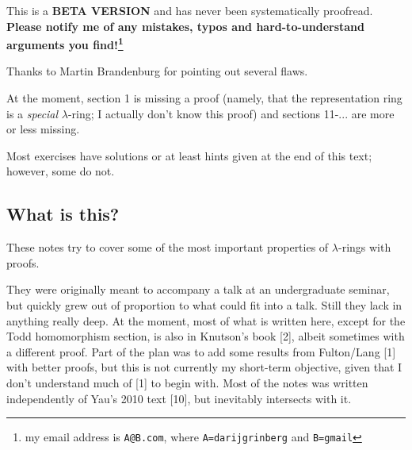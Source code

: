 \documentclass[numbers=enddot,12pt,final,onecolumn,notitlepage]{scrartcl}%
\begin{document}
\title{}
\author{Darij Grinberg}
\date{Version 0.0.17, last revised
\today
}
\maketitle
\tableofcontents



\bigskip

This is a \textbf{BETA VERSION} and has never been systematically proofread.
\textbf{Please notify me of any mistakes, typos and hard-to-understand
arguments you find!\footnote{my email address is \texttt{A@B.com}, where
\texttt{A=darijgrinberg} and \texttt{B=gmail}}}

Thanks to Martin Brandenburg for pointing out several flaws.

At the moment, section 1 is missing a proof (namely, that the representation
ring is a \textit{special} $\lambda$-ring; I actually don't know this proof)
and sections 11-... are more or less missing.

Most exercises have solutions or at least hints given at the end of this text;
however, some do not.

\bigskip

\subsection*{What is this?}

These notes try to cover some of the most important properties of $\lambda
$-rings with proofs.

They were originally meant to accompany a talk at an undergraduate seminar,
but quickly grew out of proportion to what could fit into a talk. Still they
lack in anything really deep. At the moment, most of what is written here,
except for the Todd homomorphism section, is also in Knutson's book [2],
albeit sometimes with a different proof. Part of the plan was to add some
results from Fulton/Lang [1] with better proofs, but this is not currently my
short-term objective, given that I don't understand much of [1] to begin with.
Most of the notes was written independently of Yau's 2010 text [10], but
inevitably intersects with it.
\end{document}
